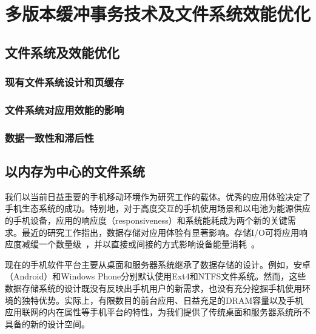 \chapter{多版本缓冲事务技术及文件系统效能优化}
\label{chap:vct}

\section{文件系统及效能优化}

\subsection{现有文件系统设计和页缓存}

\subsection{文件系统对应用效能的影响}

\subsection{数据一致性和滞后性}

\section{以内存为中心的文件系统}

我们以当前日益重要的手机移动环境作为研究工作的载体。优秀的应用体验决定了手机生态系统的成功。特别地，对于高度交互的手机使用场景和以电池为能源供应的手机设备，应用的响应度（responsiveness）和系统能耗成为两个新的关键需求。最近的研究工作指出，数据存储对应用体验有显著影响。存储I/O可将应用响应度减缓一个数量级~\cite{Desnoyers:2013:SRN:2534861.2534867, Kim:RSS:2012,Lee:2012:SLD:2380356.2380367, Nguyen:2014:ISR:2638728.2638841}，并以直接或间接的方式影响设备能量消耗~\cite{Li:2014:EOM:2591305.2591316,Nguyen:2013:SSE:2493432.2493505,
Xu:2013:OBE:2462456.2464444}。

现在的手机软件平台主要从桌面和服务器系统继承了数据存储的设计。例如，安卓（Android）和Windows Phone分别默认使用Ext4和NTFS文件系统。然而，这些数据存储系统的设计既没有反映出手机用户的新需求，也没有充分挖掘手机使用环境的独特优势。实际上，有限数目的前台应用、日益充足的DRAM容量以及手机应用联网的内在属性等手机平台的特性，为我们提供了传统桌面和服务器系统所不具备的新的设计空间。

